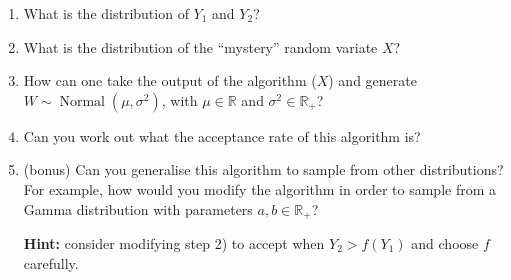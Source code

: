 \documentclass[a4paper,10pt, notitlepage]{report}
\begin{document}
\begin{enumerate}
 \item What is the distribution of $Y_1$ and $Y_2$?
 \item What is the distribution of the ``mystery'' random variate $X$? 
 \item How can one take the output of the algorithm ($X$) and generate $W \sim \operatorname{Normal}(\mu, \sigma^2)$, with $\mu \in \mathbb{R}$ and $\sigma^2 \in \mathbb{R}_+$?
 \item Can you work out what the acceptance rate of this algorithm is?
 \item (bonus) Can you generalise this algorithm to sample from other distributions? For example, how would you modify the algorithm in order to sample from a Gamma distribution with parameters $a, b \in \mathbb{R}_+$?
 
 \textbf{Hint:} consider modifying step 2) to accept when $Y_2 > f(Y_1)$ and choose $f$ carefully.
\end{enumerate}
\end{document}
